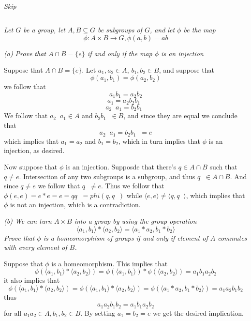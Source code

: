 \documentclass[11pt,oneside,titlepage]{book}
\DeclareMathOperator \inv {^{-1}}
\newcommand{\eangle}[1]{\langle #1 \rangle}
\newcommand{\set}[1]{\{ #1 \}}
\begin{document}
\subsection{}

\textit{Skip}

\subsection{}

\textit{Let $G$ be a group, let $A, B \subseteq G$ be subgroups of
  $G$, and let $\phi$ be the map
  $$\phi: A \times B \to G, \phi(a, b) = ab$$}

\textit{(a) Prove that $A \cap B = \set{e}$ if and only if the map $\phi$ is an injection}

Suppose that $A \cap B = \set{e}$. Let $a_1, a_2 \in A$, $b_1, b_2 \in
B$, and suppose that
$$\phi(a_1, b_1) = \phi(a_2, b_2)$$
we follow that
$$a_1 b_1 = a_2 b_2$$
$$a_1  = a_2 b_2 b_1\inv$$
$$a_2 \inv a_1  = b_2 b_1\inv$$
We follow that $a_2 \inv a_1 \in A$ and $b_2 b_1 \inv \in B$, and
since they are equal we conclude that
$$a_2 \inv a_1 = b_2 b_1\inv  = e$$
which implies that $a_1 = a_2$ and $b_1 = b_2$, which in turn implies
that $\phi$ is an injection, as desired.

Now suppose that $\phi$ is an injection. Supposde that there's $q \in
A \cap B$ such that $q \neq e$. Intersection of any two subgroups is a
subgroup, and thus $q\inv \in A \cap B$. And since $q \neq e$ we
follow that $q\inv \neq e$. Thus we follow that $\phi(e, e) = e * e =
e = q q\inv = phi(q, q\inv)$ while $\eangle{e, e} \neq \eangle{q,
q\inv}$, which implies that $\phi$ is not an injection, which is a
contradiction.

\textit{(b) We can turn $A \times B$ into a group by using the group
  operation
  $$\eangle{a_1, b_1} * \eangle{a_2, b_2}  = \eangle{a_1* a_2, b_1 * b_2}$$
  Prove that $\phi$ is a homeomorphism of groups if and only if element of $A$
  commutes with every element of $B$.}

Suppose that $\phi$ is a homeomorphism. This implies that
$$\phi(\eangle{a_1, b_1} * \eangle{a_2, b_2}) =
\phi(\eangle{a_1, b_1}) * \phi(\eangle{a_2, b_2}) =
a_1 b_1 a_2 b_2 $$
it also implies that 
$$\phi(\eangle{a_1, b_1} * \eangle{a_2, b_2}) =
\phi(\eangle{a_1, b_1} * \eangle{a_2, b_2}) =
\phi(\eangle{a_1 * a_2 , b_1 * b_2}) =
a_1 a_2 b_1 b_2 $$
thus
$$a_1 a_2 b_1 b_2 = a_1 b_1 a_2 b_2$$
for all $a_1 a_2 \in A, b_1, b_2 \in B$. By setting $a_1 = b_2 = e$ we
get the desired implication.
\end{document}
